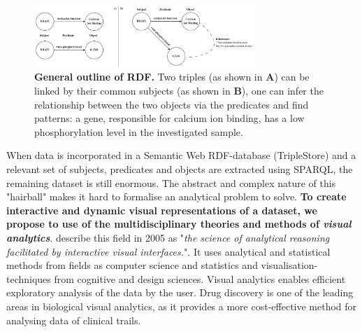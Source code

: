 \documentclass[twoside,fontsize=12pt]{article}
\begin{document}
\begin{figure}[H]
    \centering
    \includegraphics[width=0.75\textwidth]{rdf}
    \caption{\textbf{General outline of RDF.} Two triples (as shown in \textbf{A}) can be linked by their common subjects (as shown in \textbf{B}), one can infer the relationship between the two objects via the predicates and find patterns: a gene, responsible for calcium ion binding, has a low phosphorylation level in the investigated sample.}
    \label{fig:rdf}
\end{figure}
\noindent
When data is incorporated in a Semantic Web RDF-database (TripleStore) and a relevant set of subjects, predicates and objects are extracted using SPARQL, the remaining dataset is still enormous. The abstract and complex nature of this "hairball" makes it hard to formalise an analytical problem to solve. \textbf{To create interactive and dynamic visual representations of a dataset, we propose to use of the multidisciplinary theories and methods of \textit{visual analytics}}. \citet{Thomas2005} describe this field in 2005 as "\textit{the science of analytical reasoning facilitated by interactive visual interfaces.}". It uses analytical and statistical methods from fields as computer science and statistics and visualisation-techniques from cognitive and design sciences. Visual analytics enables efficient exploratory analysis of the data by the user. Drug discovery is one of the leading areas in biological visual analytics, as it provides a more cost-effective method for analysing data of clinical trails\cite{Cao2008}.
\end{document}
